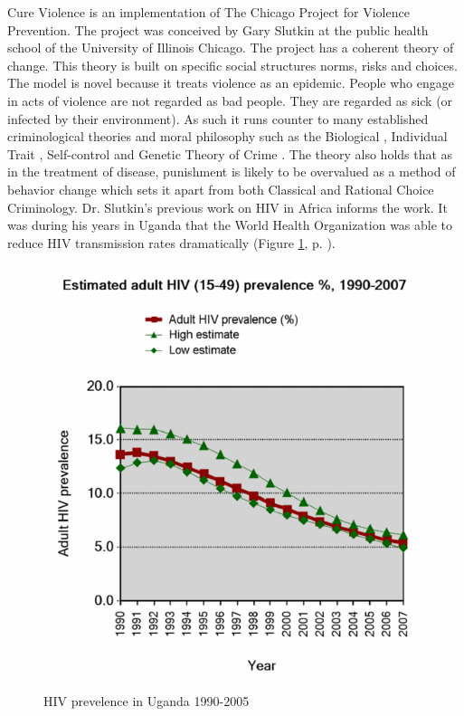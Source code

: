 \documentclass[11pt]{article}
\begin{document}
Cure Violence is an implementation of The Chicago Project for Violence
Prevention.  The project was conceived by Gary Slutkin
\parencite{ransford201321,slutkin2012violence} at the public health
school of the University of Illinois Chicago.  The project has a
coherent theory of change.  This theory is built on specific social
structures norms, risks and choices.  The model is novel because it
treats violence as an epidemic.  People who engage in acts of violence
are not regarded as bad people.  They are regarded as sick (or
infected by their environment).  As such it runs counter to many
established criminological theories and moral philosophy such as the
Biological
\parencite{Gibson2002,Lambroso1890,Lambroso1890a,Gould1996},
Individual Trait \parencite{glueck1950unraveling,glueck1956physique},
Self-control \parencite{Gott1990,Akers1991} and Genetic Theory of
Crime
\parencite{moffitt1993adolescence,moffitt2005new,barkan1992retreat}.
The theory also holds that as in the treatment of disease, punishment
is likely to be overvalued as a method of behavior change which sets
it apart from both Classical
\parencite{beccaria2009crimes,devine1981cesare} and Rational Choice
\parencite{becker1974crime,levitt2004understanding} Criminology.
Dr. Slutkin's previous work on HIV in Africa informs the work.  It was
during his years in Uganda that the World Health Organization was able
to reduce HIV transmission rates dramatically (Figure \ref{fig:hivdrop},
p. \pageref{fig:hivdrop}).

\begin{figure}[htb]
\centering
\includegraphics[width=.9\linewidth]{./assets/543px-Estimated_adult_(15-49)_HIV_prevalence,_Uganda,_1990-2007.png}
\caption{\label{fig:hivdrop}HIV prevelence in Uganda 1990-2005 \parencite{world2008epidemiological}}
\end{figure}
\end{document}
